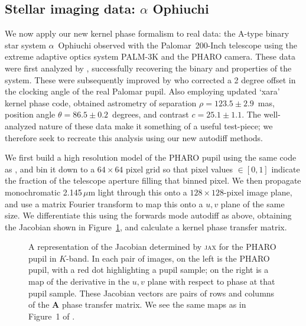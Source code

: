 \documentclass[modern]{aastex63}
\begin{document}
\subsection{Stellar imaging data: $\alpha$ Ophiuchi}
\label{sec:palomar}

We now apply our new kernel phase formalism to real data: the A-type binary star system $\alpha$~Ophiuchi observed with the Palomar~200-Inch telescope using the extreme adaptive optics system PALM-3K and the PHARO camera. These data were first analyzed by \citet{palomar}, successfully recovering the binary and properties of the system. 
These were subsequently improved by \citet{martinache20} who corrected a 2 degree offset in the clocking angle of the real Palomar pupil. Also employing updated `xara' kernel phase code, \citet{martinache20} obtained astrometry of separation $\rho = 123.5 \pm 2.9$~mas, position angle $\theta = 86.5 \pm 0.2$~degrees, and contrast $c = 25.1 \pm 1.1$. The well-analyzed nature of these data make it something of a useful test-piece; we therefore seek to recreate this analysis using our new autodiff methods.

We first build a high resolution model of the PHARO pupil using the same code as \citet{martinache20}, and bin it down to a $64\times64$ pixel grid so that pixel values $\in [0,1]$ indicate the fraction of the telescope aperture filling that binned pixel. We then propagate monochromatic 2.145\,$\mu$m light through this onto a $128\times128$-pixel image plane, and use a matrix Fourier transform to map this onto a $u,v$ plane of the same size. We differentiate this using the forwards mode autodiff as above, obtaining the Jacobian shown in Figure~\ref{pharo_jacobian}, and calculate a kernel phase transfer matrix.

\begin{figure}
\caption{A representation of the Jacobian determined by \textsc{jax} for the PHARO pupil in $K$-band. In each pair of images, on the left is the PHARO pupil, with a red dot highlighting a pupil sample; on the right is a map of the derivative in the $u,v$ plane with respect to phase at that pupil sample. These Jacobian vectors are pairs of rows and columns of the $\mathbf{A}$ phase transfer matrix. We see the same maps as in Figure~1 of \citet{martinache10}. \href{https://github.com/benjaminpope/morphine/blob/stable/notebooks/morphine_pharo_xara.ipynb}{\color{linkcolor}\faGithub}\label{pharo_jacobian}}
\end{figure}
\end{document}
